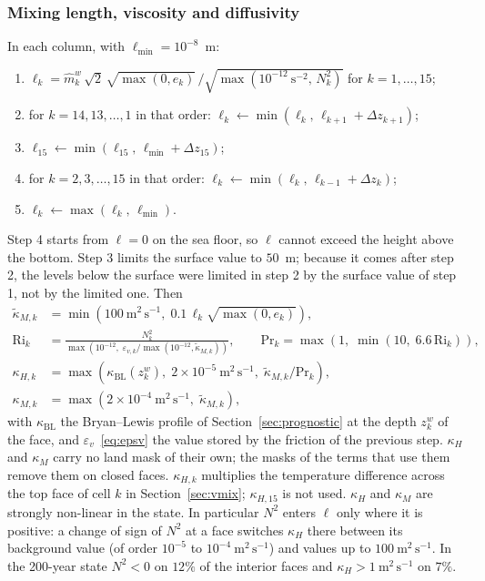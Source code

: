 \documentclass{article}
\begin{document}
\subsubsection*{Mixing length, viscosity and diffusivity}
In each column, with $\ell_\text{min} = 10^{-8}$~m:
\begin{enumerate}
\item $\ell_k = \hat m^w_k\,\sqrt{2}\,\sqrt{\max(0, e_k)}\,/\sqrt{\max(10^{-12}~\text{s}^{-2},\, N^2_k)}$ for $k = 1,\dots,15$;
\item for $k = 14, 13, \dots, 1$ in that order: $\ell_k \leftarrow \min(\ell_k,\, \ell_{k+1} + \Delta z_{k+1})$;
\item $\ell_{15} \leftarrow \min(\ell_{15},\, \ell_\text{min} + \Delta z_{15})$;
\item for $k = 2, 3, \dots, 15$ in that order: $\ell_k \leftarrow \min(\ell_k,\, \ell_{k-1} + \Delta z_k)$;
\item $\ell_k \leftarrow \max(\ell_k,\, \ell_\text{min})$.
\end{enumerate}
Step 4 starts from $\ell = 0$ on the sea floor, so $\ell$ cannot exceed the height above the bottom. Step 3 limits the surface value to $50$~m; because it comes after step 2, the levels below the surface were limited in step 2 by the surface value of step 1, not by the limited one.
Then
\begin{align*}
\tilde\kappa_{M,k} &= \min\!\left( 100~\text{m}^2\,\text{s}^{-1},\; 0.1\,\ell_k \sqrt{\max(0, e_k)} \right), \\
\text{Ri}_k &= \frac{N^2_k}{\max\!\left( 10^{-12},\; \varepsilon_{v,k} / \max(10^{-12}, \tilde\kappa_{M,k}) \right)}, \qquad
\text{Pr}_k = \max\!\left( 1,\; \min(10,\; 6.6\,\text{Ri}_k) \right), \\
\kappa_{H,k} &= \max\!\left( \kappa_\text{BL}(z^w_k),\; 2\times10^{-5}~\text{m}^2\,\text{s}^{-1},\; \tilde\kappa_{M,k}/\text{Pr}_k \right), \\
\kappa_{M,k} &= \max\!\left( 2\times10^{-4}~\text{m}^2\,\text{s}^{-1},\; \tilde\kappa_{M,k} \right),
\end{align*}
with $\kappa_\text{BL}$ the Bryan--Lewis profile of Section~\ref{sec:prognostic} at the depth $z^w_k$ of the face, and $\varepsilon_v$~\eqref{eq:epsv} the value stored by the friction of the previous step.
$\kappa_H$ and $\kappa_M$ carry no land mask of their own; the masks of the terms that use them remove them on closed faces.
$\kappa_{H,k}$ multiplies the temperature difference across the top face of cell $k$ in Section~\ref{sec:vmix}; $\kappa_{H,15}$ is not used.
$\kappa_H$ and $\kappa_M$ are strongly non-linear in the state. In particular $N^2$ enters $\ell$ only where it is positive: a change of sign of $N^2$ at a face switches $\kappa_H$ there between its background value (of order $10^{-5}$ to $10^{-4}~\text{m}^2\,\text{s}^{-1}$) and values up to $100~\text{m}^2\,\text{s}^{-1}$. In the 200-year state $N^2 < 0$ on $12\%$ of the interior faces and $\kappa_H > 1~\text{m}^2\,\text{s}^{-1}$ on $7\%$.
\end{document}
